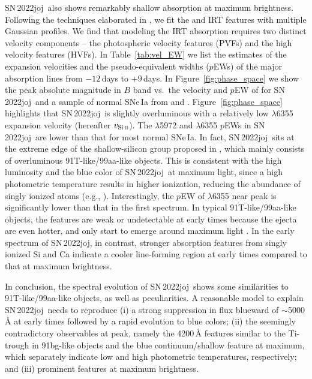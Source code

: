 \documentclass[twocolumn]{aastex631}
\newcommand{\sn}{SN\,2022joj}
\begin{document}
\begin{CJK*}{UTF8}{gbsn}
\sn\ also shows remarkably shallow  absorption at maximum brightness. Following the techniques elaborated in \citet{Liu_20jgb_2023} \citep[see also][]{Childress_2013,Childress_2014,Maguire_2014}, we fit the  and  IRT features with multiple Gaussian profiles. We find that modeling the  IRT absorption requires two distinct velocity components -- the photospheric velocity features (PVFs) and the high velocity features (HVFs). In Table~\ref{tab:vel_EW} we list the estimates of the expansion velocities and the pseudo-equivalent widths ($p$EWs) of the major absorption lines from $-12$\,days to $+9$\,days. In Figure~\ref{fig:phase_space} we show the peak absolute magnitude in $B$ band vs.\ the velocity and $p$EW of  for \sn\ and a sample of normal SNe\,Ia from \citet{Zheng_2018} and \citet{Burrow_2020}. Figure~\ref{fig:phase_space} highlights that \sn\ is slightly overluminous with a relatively low  $\lambda$6355 expansion velocity (hereafter $v_\mathrm{Si\,\textsc{ii}}$). The  $\lambda$5972 and  $\lambda$6355 $p$EWs in \sn\ are lower than that for most normal SNe\,Ia. In fact, \sn\ sits at the extreme edge of the shallow-silicon group proposed in \citet{Branch_2006}, which mainly consists of overluminous 91T-like/99aa-like objects. This is consistent with the high luminosity and the blue color of \sn\ at maximum light, since a high photometric temperature results in higher ionization, reducing the abundance of singly ionized atoms (e.g., ). Interestingly, the $p$EW of  $\lambda$6355 near peak is significantly lower than that in the first spectrum. In typical 91T-like/99aa-like objects, the  features are weak or undetectable at early times because the ejecta are even hotter, and only start to emerge around maximum light \citep{Filippenko_91T_1992}. In the early spectrum of \sn, in contrast, stronger absorption features from singly ionized Si and Ca indicate a cooler line-forming region at early times compared to that at maximum brightness.

In conclusion, the spectral evolution of \sn\ shows some similarities to 91T-like/99aa-like objects, as well as peculiarities. A reasonable model to explain \sn\ needs to reproduce (i) a strong suppression in flux blueward of $\sim$5000\,\r{A} at early times followed by a rapid evolution to blue colors; (ii) the seemingly contradictory observables at peak, namely the 4200\,\r{A} features similar to the Ti-trough in 91bg-like objects and the blue continuum/shallow  feature at maximum, which separately indicate low and high photometric temperatures, respectively; and (iii) prominent  features at maximum brightness. 


\end{CJK*}
\end{document}

